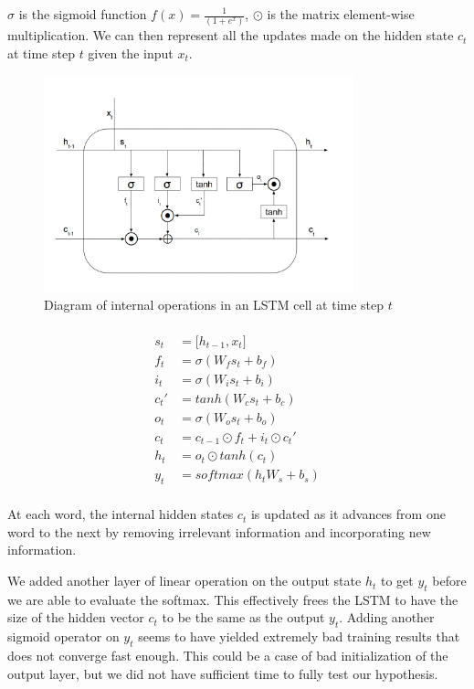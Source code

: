 \documentclass[fyp]{socreport}
\begin{document}
$\sigma$ is the sigmoid function $f(x) = \frac{1}{(1 + e^x)}$, $\odot$ is the
matrix element-wise multiplication. We can then represent all the updates
made on the hidden state $c_t$ at time step $t$ given the input $x_t$.
{
\begin{figure}
    \centering
    \includegraphics[width=0.8\textwidth]{LSTM.png}
    \caption{Diagram of internal operations in an LSTM cell at time step $t$}
\end{figure}

\begin{align*}
  \\
  s_t &= \lbrack h_{t-1}, x_{t} \rbrack \\
  f_t &= \sigma \left( W_f s_t + b_f \right) \\
  i_t &= \sigma \left( W_i s_t + b_i \right) \\
  c_t' &= tanh \left( W_c s_t + b_c \right) \\
  o_t &= \sigma \left( W_o s_t + b_o \right) \\
  c_t &= c_{t-1} \odot f_t + i_t \odot c_t' \\
  h_t &= o_t \odot tanh \left( c_t \right) \\
  y_t &= softmax \left( h_t W_s + b_s \right) \\
\end{align*}
}

At each word, the internal hidden states $c_t$ is updated as it advances from
one word to the next by removing irrelevant information and incorporating
new information.

We added another layer of linear operation on the output state $h_t$ to get
$y_t$ before we are able to evaluate the softmax. This effectively frees the
LSTM to have the size of the hidden vector $c_t$ to be the same as the output
$y_t$. Adding another sigmoid operator on $y_t$ seems to have yielded extremely
bad training results that does not converge fast enough. This could be a case
of bad initialization of the output layer, but we did not have sufficient time
to fully test our hypothesis.
\end{document}
